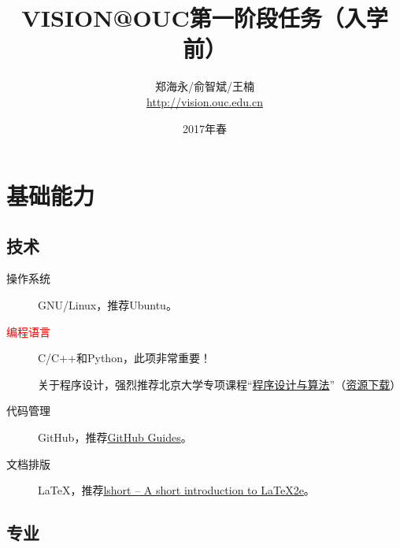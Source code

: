 \documentclass[14pt,a4paper]{extarticle}
\begin{document}
\title{\vspace{-2em}VISION@OUC第一阶段任务（入学前）\vspace{-0.7em}}
\author{郑海永/俞智斌/王楠\\\url{http://vision.ouc.edu.cn}}
\date{\vspace{-0.7em}2017年春\vspace{-0.7em}}
\maketitle\thispagestyle{fancy}
\maketitle
\tableofcontents

\section{基础能力}

\subsection{技术}

\begin{description}
\item[操作系统] GNU/Linux，推荐Ubuntu。
\item[\textcolor{red}{编程语言}] C/C++和Python，此项非常重要！

关于程序设计，强烈推荐北京大学专项课程“\href{https://www.coursera.org/specializations/biancheng-suanfa}{程序设计与算法}”（\href{http://vision.ouc.edu.cn/~zhenghaiyong/courses/oop/2017spring/mooc/}{资源下载}）
\item[代码管理] GitHub，推荐\href{https://guides.github.com/}{GitHub Guides}。
\item[文档排版] \LaTeX{}，推荐\href{https://www.ctan.org/tex-archive/info/lshort/}{lshort – A short in­tro­duc­tion to \LaTeX2e{}}。
\end{description}

\subsection{专业}
\end{document}
